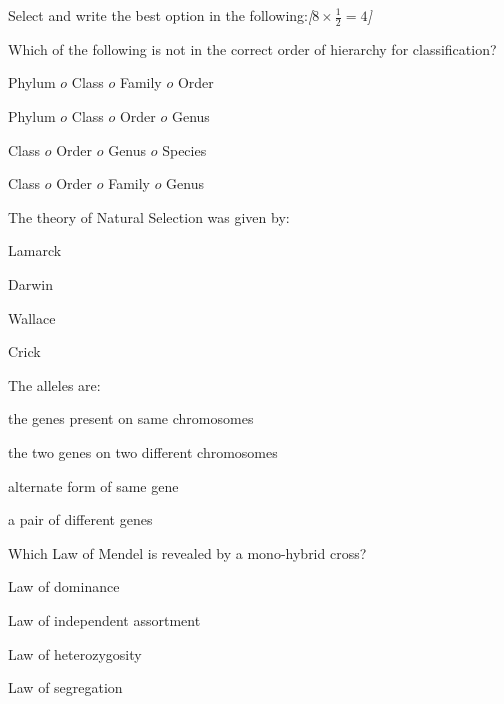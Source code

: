 \documentclass[11pt,a4paper]{article}
\newcommand{\pts}[1]{\hfill   \textit{[#1]}}
\begin{document}
\begin{parts}
  \item Select and write the best option in the following:\pts{$8  \times \frac{1}{2} = 4$}
  
\begin{parts}
    \item Which of the following is not in the correct order of hierarchy for classification?
    
\begin{parts}
      \item Phylum $ o$ Class $ o$ Family $ o$ Order
      \item Phylum $ o$ Class $ o$ Order $ o$ Genus
      \item Class $ o$ Order $ o$ Genus $ o$ Species
      \item Class $ o$ Order $ o$ Family $ o$ Genus
    \end{parts}

    \item The theory of Natural Selection was given by:
    
\begin{parts}
      \item Lamarck
      \item Darwin
      \item Wallace
      \item Crick
    \end{parts}

    \item The alleles are:
    
\begin{parts}
      \item the genes present on same chromosomes
      \item the two genes on two different chromosomes
      \item alternate form of same gene
      \item a pair of different genes
    \end{parts}

    \item Which Law of Mendel is revealed by a mono-hybrid cross?
    
\begin{parts}
      \item Law of dominance
      \item Law of independent assortment
      \item Law of heterozygosity
      \item Law of segregation
    \end{parts}


\end{parts}
\end{parts}
\end{document}
